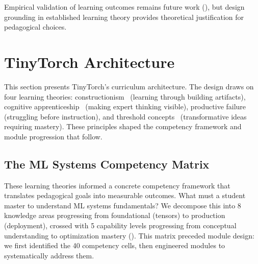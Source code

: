\documentclass[10pt,twocolumn]{article}
\begin{document}
Empirical validation of learning outcomes remains future work (), but design grounding in established learning theory provides theoretical justification for pedagogical choices.

\section{TinyTorch Architecture}
\label{sec:curriculum}

This section presents TinyTorch's curriculum architecture. The design draws on four learning theories: constructionism~\citep{papert1980mindstorms} (learning through building artifacts), cognitive apprenticeship~\citep{collins1989apprenticeship} (making expert thinking visible), productive failure~\citep{kapur2008} (struggling before instruction), and threshold concepts~\citep{meyer2003threshold} (transformative ideas requiring mastery). These principles shaped the competency framework and module progression that follow.

\subsection{The ML Systems Competency Matrix}
\label{subsec:competency-matrix}

These learning theories informed a concrete competency framework that translates pedagogical goals into measurable outcomes. What must a student master to understand ML systems fundamentals? We decompose this into 8 knowledge areas progressing from foundational (tensors) to production (deployment), crossed with 5 capability levels progressing from conceptual understanding to optimization mastery (). This matrix preceded module design: we first identified the 40 competency cells, then engineered modules to systematically address them.
\end{document}
